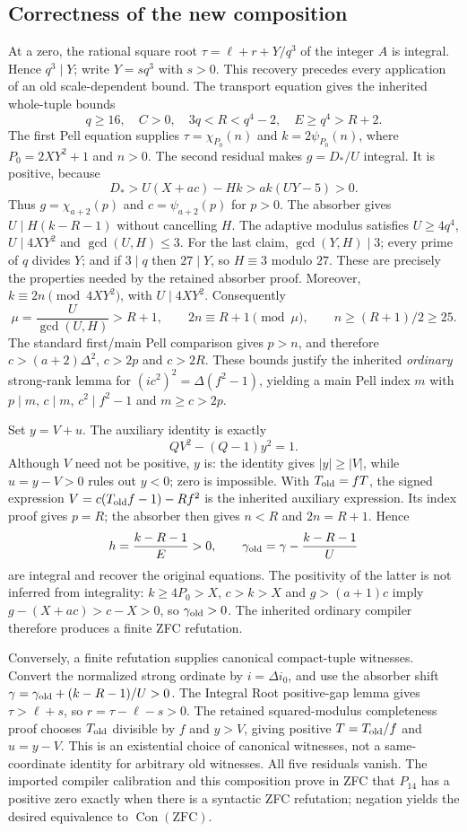 \subsection{Correctness of the new composition}
At a zero, the rational square root
$\tau=\ell+r+Y/q^3$ of the integer $A$ is integral. Hence $q^3\mid Y$;
write $Y=sq^3$ with $s>0$. This recovery precedes every application of an
old scale-dependent bound. The transport equation gives the inherited
whole-tuple bounds
\[
 q\ge16,\quad C>0,\quad 3q<R<q^4-2,\quad E\ge q^4>R+2.
\]
The first Pell equation supplies
$\tau=\chi_{P_0}(n)$ and $k=2\psi_{P_0}(n)$, where
$P_0=2XY^2+1$ and $n>0$.
The second residual makes $g=D_*/U$ integral. It is positive, because
\[
 D_*>U(X+ac)-Hk>ak(UY-5)>0.
\]
Thus $g=\chi_{a+2}(p)$ and $c=\psi_{a+2}(p)$ for $p>0$.
The absorber gives $U\mid H(k-R-1)$ without cancelling $H$.
The adaptive modulus satisfies $U\ge4q^4$, $U\mid4XY^2$ and
$\gcd(U,H)\le3$. For the last claim, $\gcd(Y,H)\mid3$; every prime
of $q$ divides $Y$; and if $3\mid q$ then $27\mid Y$, so $H\equiv3$
modulo $27$. These are precisely the properties needed by the retained
absorber proof. Moreover,
$k\equiv2n\pmod{4XY^2}$, with $U\mid4XY^2$. Consequently
\[
 \mu=\frac{U}{\gcd(U,H)}>R+1,\qquad
 2n\equiv R+1\pmod\mu,\qquad n\ge(R+1)/2\ge25.
\]
The standard first/main Pell comparison gives $p>n$, and therefore
$c>(a+2)\Delta^2$, $c>2p$ and $c>2R$.
These bounds justify the inherited \emph{ordinary} strong-rank lemma for
$(ic^2)^2=\Delta(f^2-1)$, yielding a main Pell index $m$ with
$p\mid m$, $c\mid m$, $c^2\mid f^2-1$ and $m\ge c>2p$.

Set $y=V+u$. The auxiliary identity is exactly
\[
 QV^2-(Q-1)y^2=1.
\]
Although $V$ need not be positive, $y$ is: the identity gives
$|y|\ge|V|$, while $u=y-V>0$ rules out $y<0$; zero is impossible.
With $T_{\rm old}=fT$, the signed expression
$V=c(T_{\rm old}f-1)-Rf^2$ is the inherited auxiliary expression.
Its index proof gives $p=R$; the absorber then gives $n<R$ and
$2n=R+1$. Hence
\[
 h=\frac{k-R-1}{E}>0,\qquad
 \gamma_{\rm old}=\gamma-\frac{k-R-1}{U}
\]
are integral and recover the original equations.
The positivity of the latter is not inferred from integrality:
$k\ge4P_0>X$, $c>k>X$ and $g>(a+1)c$ imply
$g-(X+ac)>c-X>0$, so $\gamma_{\rm old}>0$.
The inherited ordinary compiler therefore produces a finite ZFC refutation.

Conversely, a finite refutation supplies canonical compact-tuple witnesses.
Convert the normalized strong ordinate by $i=\Delta i_0$, and use the
absorber shift $\gamma=\gamma_{\rm old}+(k-R-1)/U>0$.
The Integral Root positive-gap lemma gives $\tau>\ell+s$, so
$r=\tau-\ell-s>0$. The retained squared-modulus completeness proof chooses
$T_{\rm old}$ divisible by $f$ and $y>V$, giving positive
$T=T_{\rm old}/f$ and $u=y-V$. This is an existential choice of canonical
witnesses, not a same-coordinate identity for arbitrary old witnesses.
All five residuals vanish. The imported compiler calibration and this
composition prove in ZFC that $P_{14}$ has a positive zero exactly when
there is a syntactic ZFC refutation; negation yields the desired equivalence
to $\operatorname{Con}(\mathrm{ZFC})$.

